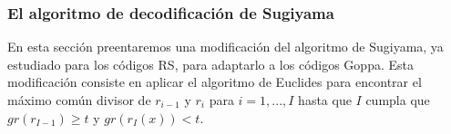\subsubsection{El algoritmo de decodificación de Sugiyama}



En esta sección preentaremos una modificación del algoritmo de Sugiyama, ya estudiado para los códigos RS, para adaptarlo a los códigos Goppa. Esta modificación consiste en aplicar el algoritmo de Euclides para encontrar el máximo común divisor de $r_{i-1}$ y $r_i$ para $i = 1,..., I$ hasta que $I$  cumpla que $gr(r_{I-1}) \geq t$ y $gr(r_I(x)) < t$.


\begin{comment}
Dado $g(x)$ un polinomio de Goppa con grado $2t$, el algoritmo de decodificación de Sugiyama para los códigos Goppa es el siguiente.

\begin{itemize}
    \item[I.] Calcular el síndrome $S(x)$.
    \item[II.] Sean $r_{-1}(x) = g(x)$, $r_0(x) = S(x)$, $U_{-1}(x) = 0$ y $U_0(x) = 1$.
    \item[III.] Buscar $q_i(x)$ y $r_i(x)$ aplicando el algoritmo de Euclides para encontrar el máximo común divisor de $r_{-1}(x)$ y $r_0(x)$ para $i = 1,..., k$, hasta que $k$ cumpla que $gr(r_{k-1}(x)) \geq t$ y $gr(r_k(x)) < t$:

        $$r_{i-2}(x) = r_{i-1}(x) q_i(x) + r_i(x), \qquad gr(r_i(x)) < gr(r_{i-1})(x)$$
    
    \item[IV.] Calcular $U_k(x)$, donde
    
        $$U_i(x) = q_i(x) U_{i-1}(x) + U_{i-2}(x)$$

    \item[V.] La solución viene dada por:
        $$\eta(x) = (-1)^k \delta r_k(x)$$
        $$\sigma(x) = \delta U_k(x)$$
\end{itemize}

\begin{proposition}
    Sea $e$ el número de errores que ocurren realmente y sea $k$ el número de iteraciones del algoritmo descrito, entonces $k \leq e$.
\end{proposition}

\end{comment}